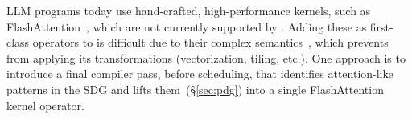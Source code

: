  LLM programs today use hand-crafted, high-performance kernels, such as FlashAttention~\cite{dao2022flashattention}, which are not currently supported by \sys{}. Adding these as first-class operators to \sys{} is difficult due to their complex semantics~\cite{barham2019machine}, which prevents \sys{} from applying its transformations (vectorization, tiling, etc.). One approach is to introduce a final compiler pass, before scheduling, that identifies attention-like patterns in the SDG and lifts them~(\S\ref{sec:pdg}) into a single FlashAttention kernel operator. %

